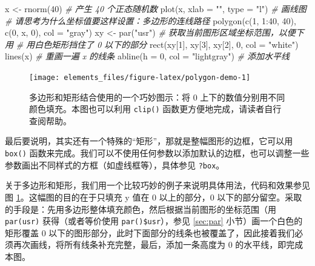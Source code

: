 \documentclass[
  b5paper,
  UTF8,twoside]{book}
\newenvironment{Shaded}{\begin{snugshade}}{\end{snugshade}}
\newcommand{\AttributeTok}[1]{\textcolor[rgb]{0.77,0.63,0.00}{#1}}
\newcommand{\CommentTok}[1]{\textcolor[rgb]{0.56,0.35,0.01}{\textit{#1}}}
\newcommand{\DecValTok}[1]{\textcolor[rgb]{0.00,0.00,0.81}{#1}}
\newcommand{\FunctionTok}[1]{\textcolor[rgb]{0.00,0.00,0.00}{#1}}
\newcommand{\NormalTok}[1]{#1}
\newcommand{\OtherTok}[1]{\textcolor[rgb]{0.56,0.35,0.01}{#1}}
\newcommand{\SpecialCharTok}[1]{\textcolor[rgb]{0.00,0.00,0.00}{#1}}
\newcommand{\StringTok}[1]{\textcolor[rgb]{0.31,0.60,0.02}{#1}}
\begin{document}
\begin{Shaded}
\begin{Highlighting}[]
\NormalTok{x }\OtherTok{\textless{}{-}} \FunctionTok{rnorm}\NormalTok{(}\DecValTok{40}\NormalTok{) }\CommentTok{\# 产生 40 个正态随机数}
\FunctionTok{plot}\NormalTok{(x, }\AttributeTok{xlab =} \StringTok{""}\NormalTok{, }\AttributeTok{type =} \StringTok{"l"}\NormalTok{) }\CommentTok{\# 画线图}
\CommentTok{\# 请思考为什么坐标值要这样设置：多边形的连线路径}
\FunctionTok{polygon}\NormalTok{(}\FunctionTok{c}\NormalTok{(}\DecValTok{1}\NormalTok{, }\DecValTok{1}\SpecialCharTok{:}\DecValTok{40}\NormalTok{, }\DecValTok{40}\NormalTok{), }\FunctionTok{c}\NormalTok{(}\DecValTok{0}\NormalTok{, x, }\DecValTok{0}\NormalTok{), }\AttributeTok{col =} \StringTok{"gray"}\NormalTok{)}
\NormalTok{xy }\OtherTok{\textless{}{-}} \FunctionTok{par}\NormalTok{(}\StringTok{"usr"}\NormalTok{) }\CommentTok{\# 获取当前图形区域坐标范围，以便下用}
\CommentTok{\# 用白色矩形挡住了 0 以下的部分}
\FunctionTok{rect}\NormalTok{(xy[}\DecValTok{1}\NormalTok{], xy[}\DecValTok{3}\NormalTok{], xy[}\DecValTok{2}\NormalTok{], }\DecValTok{0}\NormalTok{, }\AttributeTok{col =} \StringTok{"white"}\NormalTok{)}
\FunctionTok{lines}\NormalTok{(x) }\CommentTok{\# 重画一遍 x 的线条}
\FunctionTok{abline}\NormalTok{(}\AttributeTok{h =} \DecValTok{0}\NormalTok{, }\AttributeTok{col =} \StringTok{"lightgray"}\NormalTok{) }\CommentTok{\# 添加水平线}
\end{Highlighting}
\end{Shaded}

\begin{figure}

{\centering \texttt{[image: elements\_files/figure-latex/polygon-demo-1]} 

}

\caption[多边形和矩形结合使用的一个巧妙图示]{多边形和矩形结合使用的一个巧妙图示：将 0 上下的数值分别用不同颜色填充。本图也可以利用 \texttt{clip()} 函数更方便地完成，请读者自行查阅帮助。}\label{fig:polygon-demo}
\end{figure}





最后要说明，其实还有一个特殊的``矩形''，那就是整幅图形的边框，它可以用 \texttt{box()} 函数来完成。我们可以不使用任何参数以添加默认的边框，也可以调整一些参数画出不同样式的方框（如虚线框等），具体参见 \texttt{?box}。

关于多边形和矩形，我们用一个比较巧妙的例子来说明具体用法，代码和效果参见图 \ref{fig:polygon-demo}。这幅图的目的在于只填充 y 值在 0 以上的部分，0 以下的部分留空。采取的手段是：先用多边形整体填充颜色，然后根据当前图形的坐标范围（用 \texttt{par(\textquotesingle{}usr\textquotesingle{})} 获得（或者等价使用 \texttt{par()\$usr}），参见 \ref{sec:par} 小节）画一个白色的矩形覆盖 0 以下的图形部分，此时下面部分的线条也被覆盖了，因此接着我们必须再次画线，将所有线条补充完整，最后，添加一条高度为 0 的水平线，即完成本图。
\end{document}
